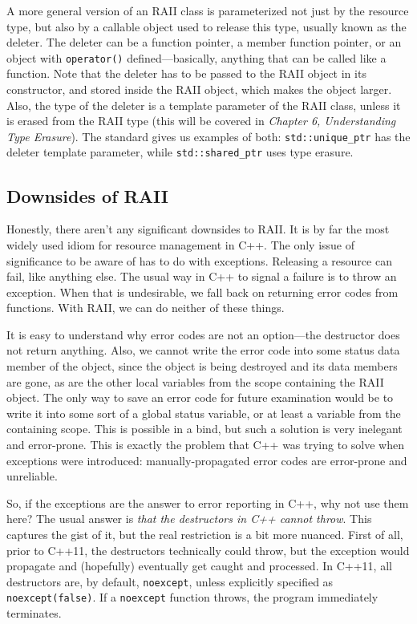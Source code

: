 A more general version of an RAII class is parameterized not just by the resource type, but also by a callable object used to release this type, usually known as the deleter. The deleter can be a function pointer, a member function pointer, or an object with \texttt{operator()} defined---basically, anything that can be called like a function. Note that the deleter has to be passed to the RAII object in its constructor, and stored inside the RAII object, which makes the object larger. Also, the type of the deleter is a template parameter of the RAII class, unless it is erased from the RAII type (this will be covered in \emph{Chapter 6, Understanding Type Erasure}). The standard gives us examples of both: \texttt{std::unique\_ptr} has the deleter template parameter, while \texttt{std::shared\_ptr} uses type erasure.

\subsection{Downsides of RAII}

Honestly, there aren't any significant downsides to RAII. It is by far the most widely used idiom for resource management in C++. The only issue of significance to be aware of has to do with exceptions. Releasing a resource can fail, like anything else. The usual way in C++ to signal a failure is to throw an exception. When that is undesirable, we fall back on returning error codes from functions. With RAII, we can do neither of these things.

It is easy to understand why error codes are not an option---the destructor does not return anything. Also, we cannot write the error code into some status data member of the object, since the object is being destroyed and its data members are gone, as are the other local variables from the scope containing the RAII object. The only way to save an error code for future examination would be to write it into some sort of a global status variable, or at least a variable from the containing scope. This is possible in a bind, but such a solution is very inelegant and error-prone. This is exactly the problem that C++ was trying to solve when exceptions were introduced: manually-propagated error codes are error-prone and unreliable.

So, if the exceptions are the answer to error reporting in C++, why not use them here? The usual answer is \emph{that the destructors in C++ cannot throw}. This captures the gist of it, but the real restriction is a bit more nuanced. First of all, prior to C++11, the destructors technically could throw, but the exception would propagate and (hopefully) eventually get caught and processed. In C++11, all destructors are, by default, \texttt{noexcept}, unless explicitly specified as \texttt{noexcept(false)}. If a \texttt{noexcept} function throws, the program immediately terminates.


